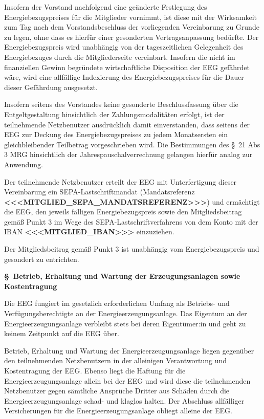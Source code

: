 \documentclass[a4paper,11pt]{article}
\newcounter{parasec}
\newcommand{\parasec}[1]{%
  \stepcounter{parasec}%
  \par\Needspace*{5\baselineskip}%
  \bigskip
  {\large\bfseries\color{tuerkis}\S\ \theparasec\quad #1}\par\nopagebreak
  \smallskip\nopagebreak
}
\begin{document}
Insofern der Vorstand nachfolgend eine geänderte Festlegung des Energiebezugspreises für die Mitglieder vornimmt, ist diese mit der Wirksamkeit zum Tag nach dem Vorstandsbeschluss der vorliegenden Vereinbarung zu Grunde zu legen, ohne dass es hierfür einer gesonderten Vertragsanpassung bedürfte. Der Energiebezugspreis wird unabhängig von der tageszeitlichen Gelegenheit des Energiebezuges durch die Mitgliederseite vereinbart. Insofern die nicht im finanziellen Gewinn begründete wirtschaftliche Disposition der EEG gefährdet wäre, wird eine allfällige Indexierung des Energiebezugspreises für die Dauer dieser Gefährdung ausgesetzt.

Insofern seitens des Vorstandes keine gesonderte Beschlussfassung über die Entgeltgestaltung hinsichtlich der Zahlungsmodalitäten erfolgt, ist der teilnehmende Netzbenutzer ausdrücklich damit einverstanden, dass seitens der EEG zur Deckung des Energiebezugspreises zu jedem Monatsersten ein gleichbleibender Teilbetrag vorgeschrieben wird. Die Bestimmungen des \S\ 21 Abs 3 MRG hinsichtlich der Jahrespauschalverrechnung gelangen hierfür analog zur Anwendung.

Der teilnehmende Netzbenutzer erteilt der EEG mit Unterfertigung dieser Vereinbarung ein SEPA-Lastschriftmandat (Mandatsreferenz \textbf{<<<MITGLIED_SEPA_MANDATSREFERENZ>>>}) und ermächtigt die EEG, den jeweils fälligen Energiebezugspreis sowie den Mitgliedsbeitrag gemäß Punkt 3 im Wege des SEPA-Lastschriftverfahrens von dem Konto mit der IBAN \textbf{<<<MITGLIED_IBAN>>>} einzuziehen.

Der Mitgliedsbeitrag gemäß Punkt 3 ist unabhängig vom Energiebezugspreis und gesondert zu entrichten.

\parasec{Betrieb, Erhaltung und Wartung der Erzeugungsanlagen sowie Kostentragung}

Die EEG fungiert im gesetzlich erforderlichen Umfang als Betriebs- und Verfügungsberechtigte an der Energieerzeugungsanlage. Das Eigentum an der Energieerzeugungsanlage verbleibt stets bei deren Eigentümer:in und geht zu keinem Zeitpunkt auf die EEG über.

Betrieb, Erhaltung und Wartung der Energieerzeugungsanlage liegen gegenüber den teilnehmenden Netzbenutzern in der alleinigen Verantwortung und Kostentragung der EEG. Ebenso liegt die Haftung für die Energieerzeugungsanlage allein bei der EEG und wird diese die teilnehmenden Netzbenutzer gegen sämtliche Ansprüche Dritter aus Schäden durch die Energieerzeugungsanlage schad- und klaglos halten. Der Abschluss allfälliger Versicherungen für die Energieerzeugungsanlage obliegt alleine der EEG.
\end{document}
